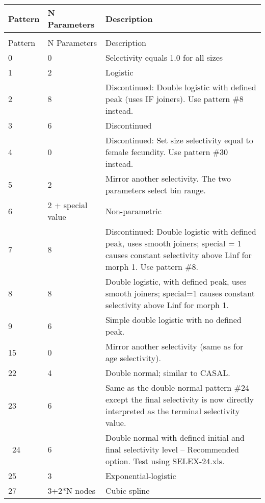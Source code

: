 \begin{center}
	\begin{longtable}{p{2cm} p{3cm} p{10cm}}
		\endfirsthead

		\hline
		Pattern & N Parameters & Description \\
		\hline
		\endhead

		\endfoot
		\endlastfoot

		\hline
		\multicolumn{3}{c}{SIZE SELECTIVITY}\\
		Pattern & N Parameters & Description \\
		\hline
		0 & 0 & Selectivity equals 1.0 for all sizes \\
		1 & 2 & Logistic \\
		2 & 8 & Discontinued: Double logistic with defined peak (uses IF joiners). Use pattern \#8 instead.\\
		3 & 6 & Discontinued \\
		4 & 0 & Discontinued: Set size selectivity equal to female fecundity. Use pattern \#30 instead.\\
		5 & 2 & Mirror another selectivity. The two parameters select bin range.\\
		6 & 2 + special value & Non-parametric \\
		7 & 8 & Discontinued: Double logistic with defined peak, uses smooth joiners; special = 1 causes constant selectivity above Linf for morph 1.  Use pattern \#8.\\
		8 & 8 & Double logistic, with defined peak, uses smooth joiners; special=1 causes constant selectivity above Linf for morph 1.  \\
		9 & 6 & Simple double logistic with no defined peak.\\
		15 & 0 & Mirror another selectivity (same as for age selectivity).\\
		22 & 4 & Double normal; similar to CASAL.\\
		23 & 6 & Same as the double normal pattern \#24 except the final selectivity is now directly interpreted as the terminal selectivity value.\\\
		24 & 6 & Double normal with defined initial and final selectivity level – Recommended option.  Test using SELEX-24.xls. \\
		25 & 3 & Exponential-logistic \\
		27 & 3+2*N nodes & Cubic spline\\
		\hline

\end{longtable}
\end{center}
